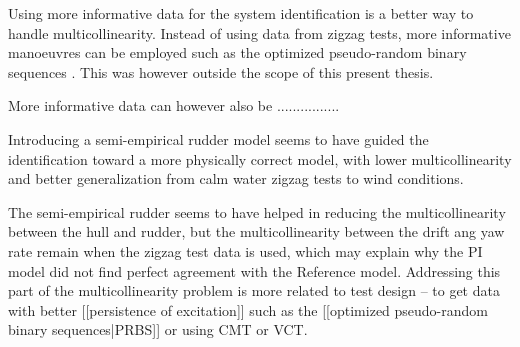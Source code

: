 Using more informative data for the system identification is a better way to handle multicollinearity. Instead of using data from zigzag tests, more informative manoeuvres can be employed such as the optimized pseudo-random binary sequences \cite{yoon_identification_2003,wang_optimal_2020}. This was however outside the scope of this present thesis.

More informative data can however also be ................

Introducing a semi-empirical rudder model seems to have guided the identification toward a more physically correct model, with lower multicollinearity and better generalization from calm water zigzag tests to wind conditions.

The semi-empirical rudder seems to have helped in reducing the multicollinearity between the hull and rudder, but the multicollinearity between the drift ang yaw rate remain when the zigzag test data is used, which may explain why the PI model did not find perfect agreement with the Reference model. Addressing this part of the multicollinearity problem is more related to test design – to get data with better [[persistence of excitation]] such as the [[optimized pseudo-random binary sequences|PRBS]] or using CMT or VCT.